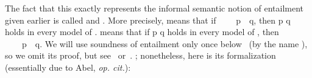 The fact that this exactly represents the informal semantic notion of entailment
given earlier is called  and
.
More precisely,  means that
if ~~~~\ab p~~\ab q, then \ab p  \ab q holds in
every model of .
 means that
if \ab p  \ab q holds in every model of ,
then ~~~~\ab p~~\ab q.
We will use soundness of entailment only once below%
\ifshort
~(by the name ), so we omit its proof, but see~\cite{Abel:2021}
or~\cite{DeMeo:2021}.
\else
; nonetheless, here is its formalization (essentially due to Abel, \textit{op. cit.}):

\begin{code}%
\>[0]\<%
\\
\>[0]\AgdaSpace{}%
%
\>[18]\AgdaSymbol{(}\AgdaSpace{}%
\AgdaSymbol{:}\AgdaSpace{}%
\AgdaSymbol{\{}\AgdaSpace{}%
\AgdaSymbol{:}\AgdaSpace{}%
\AgdaSpace{}%
\AgdaSymbol{\}}\AgdaSpace{}%
\AgdaSpace{}%
\AgdaSymbol{(}\AgdaSpace{}%
\AgdaSpace{}%
\AgdaSpace{}%
\AgdaSpace{}%
\AgdaSymbol{)}\AgdaSpace{}%
\AgdaSymbol{(}\AgdaSpace{}%
\AgdaSymbol{))}\<%
\\
%
\>[18]\AgdaSymbol{(}\AgdaSpace{}%
\AgdaSymbol{:}\AgdaSpace{}%
\AgdaSpace{}%
\AgdaSpace{}%
\AgdaSymbol{)}%
\>[52]\<%
\\
%
\>[18]\AgdaSymbol{(}\AgdaSpace{}%
\AgdaSymbol{:}\AgdaSpace{}%
\AgdaSymbol{\}}\AgdaSpace{}%
\AgdaSpace{}%
\AgdaSymbol{\{}\AgdaSpace{}%
\AgdaSymbol{=}\AgdaSpace{}%
\AgdaSymbol{\}}\AgdaSpace{}%
\AgdaSpace{}%
\AgdaSymbol{(}\AgdaSymbol{\{}\AgdaSymbol{\}))}%
\>[52]\<%
\\
%
\>[18]\<%
\\
\>[0][@{}l@{\AgdaIndent{0}}]%
\>[1]\AgdaSpace{}%
\AgdaSpace{}%
\AgdaOperator{\AgdaFunction{𝔻[}}\AgdaSpace{}%

\end{code}
